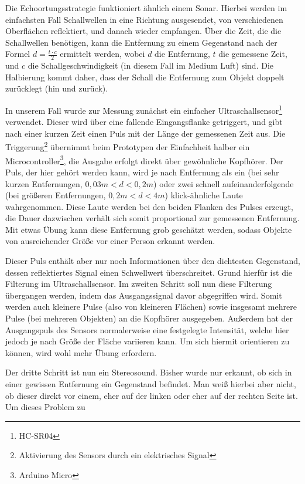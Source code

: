 \documentclass[a4paper,12pt,ngerman]{scrartcl}
\begin{document}
Die Echoortungsstrategie funktioniert ähnlich einem Sonar. Hierbei werden im einfachsten 
Fall Schallwellen in eine Richtung ausgesendet, von verschiedenen Oberflächen reflektiert,
und danach wieder empfangen. Über die Zeit, die die Schallwellen benötigen, kann die 
Entfernung zu einem Gegenstand nach der Formel $d = \frac{t \cdot c}{2}$ ermittelt werden,
wobei $d$ die Entfernung, $t$ die gemessene Zeit, und $c$ die Schallgeschwindigkeit (in 
diesem Fall im Medium Luft) sind. Die Halbierung kommt daher, dass der Schall die 
Entfernung zum Objekt doppelt zurücklegt (hin und zurück). \par
In unserem Fall wurde zur Messung zunächst ein einfacher Ultraschallsensor\footnote{HC-SR04} 
verwendet. Dieser wird über eine fallende Eingangsflanke getriggert, und gibt nach einer 
kurzen Zeit einen Puls mit der Länge der gemessenen Zeit aus. Die Triggerung\footnote{Aktivierung des
Sensors durch ein elektrisches Signal} übernimmt 
beim Prototypen der Einfachheit halber ein Microcontroller\footnote{Arduino Micro}, die 
Ausgabe erfolgt direkt über gewöhnliche Kopfhörer. Der Puls, der hier gehört werden kann, 
wird je nach Entfernung als ein (bei sehr kurzen Entfernungen, $0{,}03m < d < 0{,}2m$) oder 
zwei schnell aufeinanderfolgende (bei größeren Entfernungen, $0{,}2m < d < 4m$) klick-ähnliche 
Laute wahrgenommen. Diese Laute werden bei den beiden Flanken des Pulses erzeugt, die Dauer 
dazwischen verhält sich somit proportional zur gemessenen Entfernung. Mit etwas Übung kann 
diese Entfernung grob geschätzt werden, sodass Objekte von ausreichender Größe vor einer 
Person erkannt werden. \par
Dieser Puls enthält aber nur noch Informationen über den dichtesten Gegenstand, dessen 
reflektiertes Signal einen Schwellwert überschreitet. Grund hierfür ist die Filterung im 
Ultraschallsensor. Im zweiten Schritt soll nun diese Filterung übergangen werden, indem 
das Ausgangssignal davor abgegriffen wird. Somit werden auch kleinere Pulse (also von 
kleineren Flächen) sowie insgesamt mehrere Pulse (bei mehreren Objekten) an die Kopfhörer 
ausgegeben. Außerdem hat der Ausgangspuls des Sensors normalerweise eine festgelegte 
Intensität, welche hier jedoch je nach Größe der Fläche variieren kann. Um sich hiermit 
orientieren zu können, wird wohl mehr Übung erfordern. \par
Der dritte Schritt ist nun ein Stereosound. Bisher wurde nur erkannt, ob sich in einer 
gewissen Entfernung ein Gegenstand befindet. Man weiß hierbei aber nicht, ob dieser direkt 
vor einem, eher auf der linken oder eher auf der rechten Seite ist. Um dieses Problem zu 
\end{document}
